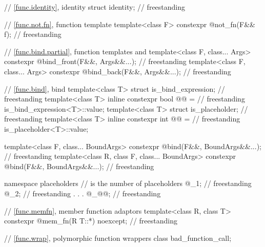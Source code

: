 \begin{codeblock}
{  // \ref{func.identity}, identity
  struct identity;                                                                  // freestanding

  // \ref{func.not.fn}, function template 
  template<class F> constexpr @\unspec@ not_fn(F&& f);                            // freestanding

  // \ref{func.bind.partial}, function templates  and 
  template<class F, class... Args>
    constexpr @\unspec@ bind_front(F&&, Args&&...);                               // freestanding
  template<class F, class... Args>
    constexpr @\unspec@ bind_back(F&&, Args&&...);                                // freestanding

  // \ref{func.bind}, bind
  template<class T> struct is_bind_expression;                                      // freestanding
  template<class T>
    inline constexpr bool @@ =                                    // freestanding
      is_bind_expression<T>::value;
  template<class T> struct is_placeholder;                                          // freestanding
  template<class T>
    inline constexpr int @@ =                                         // freestanding
      is_placeholder<T>::value;

  template<class F, class... BoundArgs>
    constexpr @\unspec@ bind(F&&, BoundArgs&&...);                                // freestanding
  template<class R, class F, class... BoundArgs>
    constexpr @\unspec@ bind(F&&, BoundArgs&&...);                                // freestanding

  namespace placeholders {
    //  is the  number of placeholders
    @\seebelownc@ _1;                                                                   // freestanding
    @\seebelownc@ _2;                                                                   // freestanding
               .
               .
               .
    @\seebelownc@ _@@;                                                                   // freestanding
  }

  // \ref{func.memfn}, member function adaptors
  template<class R, class T>
    constexpr @\unspec@ mem_fn(R T::*) noexcept;                                  // freestanding

  // \ref{func.wrap}, polymorphic function wrappers
  class bad_function_call;

}
\end{codeblock}

